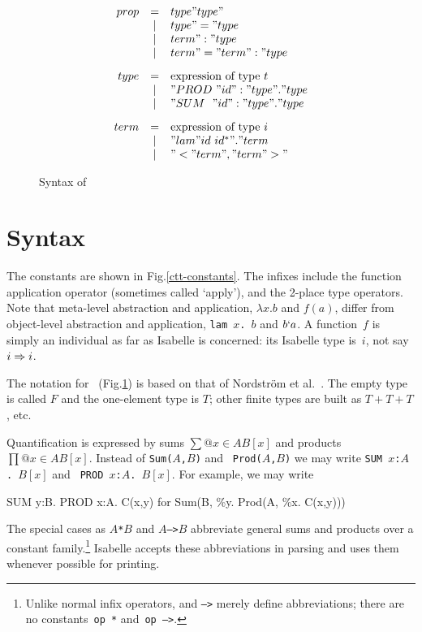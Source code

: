 \begin{figure}
\begin{center}
\dquotes
\[ \begin{array}{rcl}
prop    & = &  type " type"       \\
        & | & type " = " type     \\
        & | & term " : " type        \\
        & | & term " = " term " : " type 
\\[2ex]
type    & = & \hbox{expression of type~$t$} \\
        & | & "PROD~" id " : " type " . " type  \\
        & | & "SUM~~" id " : " type " . " type 
\\[2ex]
term    & = & \hbox{expression of type~$i$} \\
        & | & "lam " id~id^* " . " term   \\
        & | & "< " term " , " term " >"
\end{array} 
\]
\end{center}
\caption{Syntax of {\CTT}} \label{ctt-syntax}
\end{figure}



\section{Syntax}
The constants are shown in Fig.\ts\ref{ctt-constants}.  The infixes include
the function application operator (sometimes called `apply'), and the
2-place type operators.  Note that meta-level abstraction and application,
$\lambda x.b$ and $f(a)$, differ from object-level abstraction and
application, \hbox{\tt lam $x$. $b$} and $b{\tt`}a$.  A {\CTT}
function~$f$ is simply an individual as far as Isabelle is concerned: its
Isabelle type is~$i$, not say $i\Rightarrow i$.

The notation for~{\CTT} (Fig.\ts\ref{ctt-syntax}) is based on that of
Nordstr\"om et al.~\cite{nordstrom90}.  The empty type is called $F$ and
the one-element type is $T$; other finite types are built as $T+T+T$, etc.

Quantification is expressed by sums $\sum@{x\in A}B[x]$ and
products $\prod@{x\in A}B[x]$.  Instead of {\tt Sum($A$,$B$)} and {\tt
  Prod($A$,$B$)} we may write \hbox{\tt SUM $x$:$A$.\ $B[x]$} and \hbox{\tt
  PROD $x$:$A$.\ $B[x]$}.  For example, we may write
\begin{ttbox}
SUM y:B. PROD x:A. C(x,y)   {\rm for}   Sum(B, \%y. Prod(A, \%x. C(x,y)))
\end{ttbox}
The special cases as \hbox{\tt$A$*$B$} and \hbox{\tt$A$-->$B$} abbreviate
general sums and products over a constant family.\footnote{Unlike normal
infix operators, {\tt*} and {\tt-->} merely define abbreviations; there are
no constants~{\tt op~*} and~\hbox{\tt op~-->}.}  Isabelle accepts these
abbreviations in parsing and uses them whenever possible for printing.



